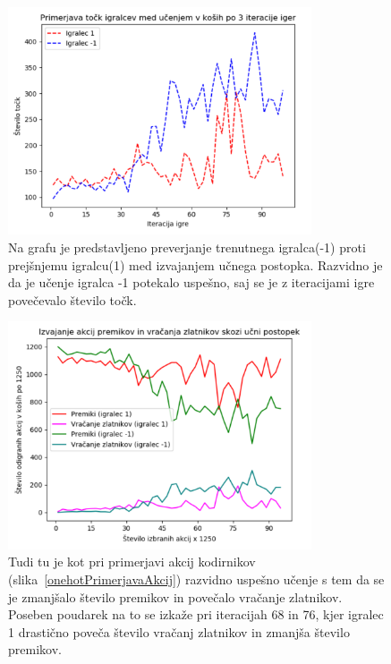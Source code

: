 \documentclass[a4paper, 12pt]{book}
\begin{document}
\begin{figure}[h!]
	\begin{center}
		\includegraphics[width=0.8\textwidth]{photos/learn_plot.pdf}
	\end{center}
	\caption{Na grafu je predstavljeno preverjanje trenutnega igralca(-1) proti prejšnjemu igralcu(1) med izvajanjem učnega postopka.
		Razvidno je da je učenje igralca -1 potekalo uspešno, saj se je z iteracijami igre povečevalo število točk.}
	\label{learn_plot}
\end{figure}

\begin{figure}[h!]
	\begin{center}
		\includegraphics[width=0.8\textwidth]{photos/return_move_learn.pdf}
	\end{center}
	\caption{Tudi tu je kot pri primerjavi akcij kodirnikov (slika~\ref{onehotPrimerjavaAkcij}) razvidno uspešno učenje s tem da se je zmanjšalo število premikov in povečalo vračanje zlatnikov.
		Poseben poudarek na to se izkaže pri iteracijah 68 in 76, kjer igralec 1 drastično poveča število vračanj zlatnikov in zmanjša število premikov.}
	\label{return_move_learn}
\end{figure}
\end{document}
